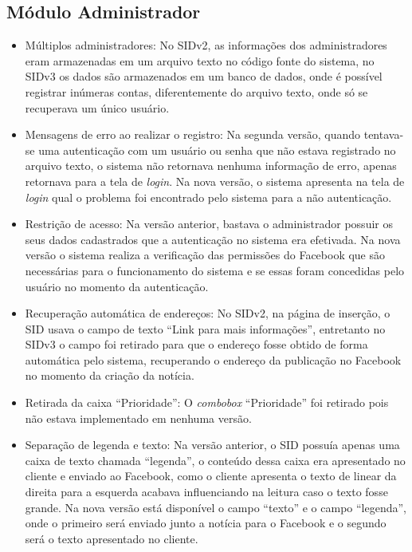 \subsection{Módulo Administrador}
    \begin{itemize}
        \item Múltiplos administradores: No SIDv2, as informações dos administradores eram armazenadas em um arquivo texto no código fonte do sistema, no SIDv3 os dados são armazenados em um banco de dados, onde é possível registrar inúmeras contas, diferentemente do arquivo texto, onde só se recuperava um único usuário.

        \item Mensagens de erro ao realizar o registro: Na segunda versão, quando tentava-se uma autenticação com um usuário ou senha que não estava registrado no arquivo texto, o sistema não retornava nenhuma informação de erro, apenas retornava para a tela de \textit{login}. Na nova versão, o sistema apresenta na tela de \textit{login} qual o problema foi encontrado pelo sistema para a não autenticação.

        \item Restrição de acesso: Na versão anterior, bastava o administrador possuir os seus dados cadastrados que a autenticação no sistema era efetivada. Na nova versão o sistema realiza a verificação das permissões do Facebook que são necessárias para o funcionamento do sistema e se essas foram concedidas pelo usuário no momento da autenticação.

        \item Recuperação automática de endereços: No SIDv2, na página de inserção, o SID usava o campo de texto ``Link para mais informações'', entretanto no SIDv3 o campo foi retirado para que o endereço fosse obtido de forma automática pelo sistema, recuperando o endereço da publicação no Facebook no momento da criação da notícia.
        
        \item Retirada da caixa ``Prioridade'': O \textit{combobox} ``Prioridade'' foi retirado pois não estava implementado em nenhuma versão.
        
        \item Separação de legenda e texto: Na versão anterior, o SID possuía apenas uma caixa de texto chamada ``legenda'', o conteúdo dessa caixa era apresentado no cliente e enviado ao Facebook, como o cliente apresenta o texto de linear da direita para a esquerda acabava influenciando na leitura caso o texto fosse grande. Na nova versão está disponível o campo ``texto'' e o campo ``legenda'', onde o primeiro será enviado junto a notícia para o Facebook e o segundo será o texto apresentado no cliente.


\end{itemize}
